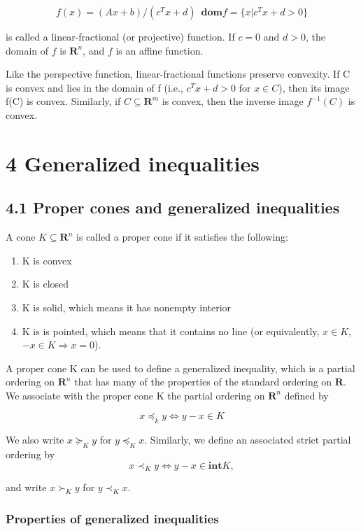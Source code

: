 \documentclass{article}
\begin{document}
\[
f(x)=(Ax+b)/(c^Tx+d)\enspace \mathbf{dom} f=\{x|c^Tx+d>0\}    
\]

is called a linear-fractional (or projective) function. If $c=0$ and $d>0$, the domain
of $f$ is $\mathbf{R}^n$, and $f$ is an affine function.

Like the perspective function, linear-fractional functions preserve convexity. If
C is convex and lies in the domain of f (i.e., $c^Tx+d > 0$ for $x \in C$), then its
image f(C) is convex. Similarly, if $C \subseteq \mathbf{R}^m$ is
convex, then the inverse image $f^{-1}(C)$ is convex.


\section*{4 Generalized inequalities}

\subsection*{4.1 Proper cones and generalized inequalities}

A cone $K \subseteq \mathbf{R}^n$ is called a proper cone if it satisfies the following:

\begin{enumerate}
    \item K is convex
    \item K is closed
    \item K is solid, which means it has nonempty interior
    \item K is is pointed, which means that it contains no line (or equivalently, $x \in K$, $-x \in K \Rightarrow x = 0$).
\end{enumerate}

A proper cone K can be used to define a generalized inequality, which is a partial
ordering on $\mathbf{R}^n$ that has many of the properties of the standard ordering on $\mathbf{R}$.
We associate with the proper cone K the partial ordering on $\mathbf{R}^n$ defined by

\[
x\preceq_k y\Leftrightarrow y-x\in K
\]

We also write $x \succeq_K y$ for $y \preceq_K x$. Similarly, we define an associated strict partial
ordering by
\[
    x \prec_K y \Leftrightarrow y - x \in \mathbf{int}K,
\]

and write $x \succ_K y$ for $y \prec_K x$.

\subsubsection*{Properties of generalized inequalities}
\end{document}
